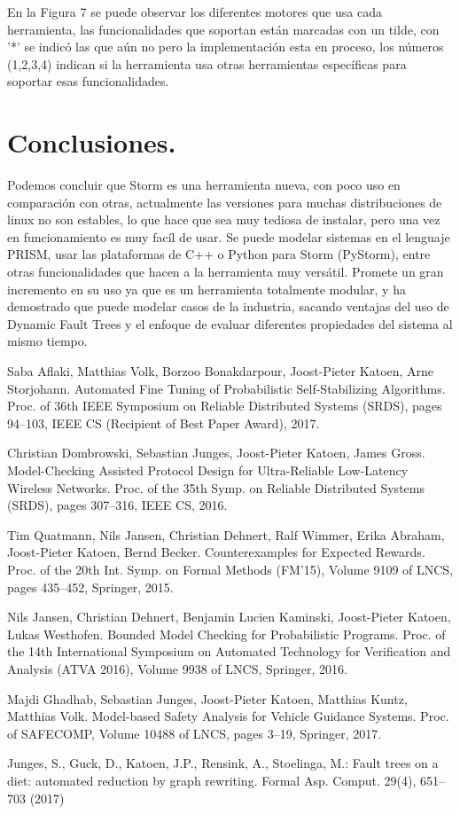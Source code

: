 \documentclass[11pt]{article}
\begin{document}
En la Figura 7 se puede observar los diferentes motores que usa cada herramienta, las funcionalidades que soportan est\'an marcadas con un tilde, con '*' se indic\'o las que a\'un no pero la implementaci\'on esta en proceso, los n\'umeros (1,2,3,4) indican si la herramienta usa otras herramientas espec\'ificas para soportar esas funcionalidades.

\section{Conclusiones.}

Podemos concluir que Storm es una herramienta nueva, con poco uso en comparaci\'on con otras, actualmente las versiones para muchas distribuciones de linux no son estables, lo que hace que sea muy tediosa de instalar, pero una vez en funcionamiento es muy fac\'il de usar. Se puede modelar sistemas en el lenguaje PRISM, usar las plataformas de C++ o Python para Storm (PyStorm), entre otras funcionalidades que hacen a la herramienta muy vers\'atil. Promete un gran incremento en su uso ya que es un herramienta totalmente modular, y ha demostrado que puede modelar casos de la industria, sacando ventajas del uso de Dynamic Fault Trees y el enfoque de evaluar diferentes propiedades del sistema al mismo tiempo.

\begin{thebibliography}{99}
	 Saba Aflaki, Matthias Volk, Borzoo Bonakdarpour, Joost-Pieter Katoen, Arne Storjohann. Automated Fine Tuning of Probabilistic Self-Stabilizing Algorithms. Proc. of 36th IEEE Symposium on Reliable Distributed Systems (SRDS), pages 94–103, IEEE CS (Recipient of Best Paper Award), 2017.	
		
	 Christian Dombrowski, Sebastian Junges, Joost-Pieter Katoen, James Gross. Model-Checking Assisted Protocol Design for Ultra-Reliable Low-Latency Wireless Networks. Proc. of the 35th Symp. on Reliable Distributed Systems (SRDS), pages 307–316, IEEE CS, 2016.
	
	 Tim Quatmann, Nils Jansen, Christian Dehnert, Ralf Wimmer, Erika Abraham, Joost-Pieter Katoen, Bernd Becker. Counterexamples for Expected Rewards. Proc. of the 20th Int. Symp. on Formal Methods (FM'15), Volume 9109 of LNCS, pages 435–452, Springer, 2015.
	
	 Nils Jansen, Christian Dehnert, Benjamin Lucien Kaminski, Joost-Pieter Katoen, Lukas Westhofen. Bounded Model Checking for Probabilistic Programs. Proc. of the 14th International Symposium on Automated Technology for Verification and Analysis (ATVA 2016), Volume 9938 of LNCS, Springer, 2016.
	
	 Majdi Ghadhab, Sebastian Junges, Joost-Pieter Katoen, Matthias Kuntz, Matthias Volk. Model-based Safety Analysis for Vehicle Guidance Systems. Proc. of SAFECOMP, Volume 10488 of LNCS, pages 3–19, Springer, 2017.
	
	 Junges, S., Guck, D., Katoen, J.P., Rensink, A., Stoelinga, M.: Fault trees on a diet: automated reduction by graph rewriting. Formal Asp. Comput. 29(4), 651–703 (2017)

\end{thebibliography}
\end{document}
